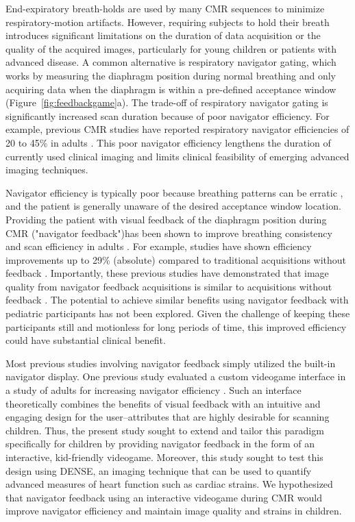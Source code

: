 	End-expiratory breath-holds are used by many CMR sequences to minimize respiratory-motion artifacts. However, requiring subjects to hold their breath introduces significant limitations on the duration of data acquisition or the quality of the acquired images, particularly for young children or patients with advanced disease. A common alternative is respiratory navigator gating, which works by measuring the diaphragm position during normal breathing and only acquiring data when the diaphragm is within a pre-defined acceptance window (Figure~\ref{fig:feedbackgame}a). The trade-off of respiratory navigator gating is significantly increased scan duration because of poor navigator efficiency. For example, previous CMR studies have reported respiratory navigator efficiencies of 20 to 45\% in adults \cite{Abd-Elmoniem2011,Feuerlein2009,Jhooti2011,Wang1996}. This poor navigator efficiency lengthens the duration of currently used clinical imaging and limits clinical feasibility of emerging advanced imaging techniques.
	
	Navigator efficiency is typically poor because breathing patterns can be erratic \cite{Liu1993,Wang1995a,Taylor1997a}, and the patient is generally unaware of the desired acceptance window location. Providing the patient with visual feedback of the diaphragm position during CMR ("navigator feedback")has been shown to improve breathing consistency and scan efficiency in adults \cite{Feuerlein2009,Liu1993}. For example, studies have shown efficiency improvements up to 29\% (absolute) compared to traditional acquisitions without feedback \cite{Feuerlein2009,Jhooti2011}. Importantly, these previous studies have demonstrated that image quality from navigator feedback acquisitions is similar to acquisitions without feedback \cite{Feuerlein2009,Jhooti2011}. The potential to achieve similar benefits using navigator feedback with pediatric participants has not been explored. Given the challenge of keeping these participants still and motionless for long periods of time, this improved efficiency could have substantial clinical benefit.
	
	Most previous studies involving navigator feedback simply utilized the built-in navigator display. One previous study evaluated a custom videogame interface in a study of adults for increasing navigator efficiency \cite{Jhooti2011}. Such an interface theoretically combines the benefits of visual feedback with an intuitive and engaging design for the user--attributes that are highly desirable for scanning children. Thus, the present study sought to extend and tailor this paradigm specifically for children by providing navigator feedback in the form of an interactive, kid-friendly videogame. Moreover, this study sought to test this design using DENSE, an imaging technique that can be used to quantify advanced measures of heart function such as cardiac strains. We hypothesized that navigator feedback using an interactive videogame during CMR would improve navigator efficiency and maintain image quality and strains in children.

